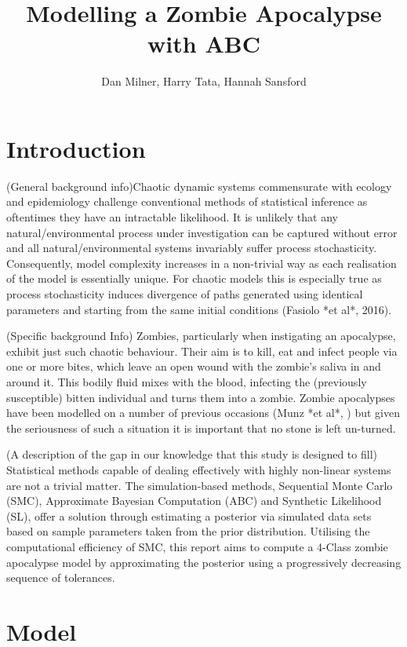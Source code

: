\documentclass[]{article}
\title{Modelling a Zombie Apocalypse with ABC}
\author{Dan Milner, Harry Tata, Hannah Sansford}
\begin{document}

\maketitle

\section{Introduction}

(General background info)Chaotic dynamic systems commensurate with ecology and epidemiology challenge conventional methods of statistical inference as oftentimes they have an intractable likelihood. It is unlikely that any natural/environmental process under investigation can be captured without error and all natural/environmental systems invariably suffer process stochasticity. Consequently, model complexity increases in a non-trivial way as each realisation of the model is essentially unique. For chaotic models this is especially true as process stochasticity induces divergence of paths generated using identical parameters and starting from the same initial conditions (Fasiolo *et al*, 2016).

(Specific background Info) Zombies, particularly when instigating an apocalypse, exhibit just such chaotic behaviour. Their aim is to kill, eat and infect people via one or more bites, which leave an open wound with the zombie's saliva in and around it. This bodily fluid mixes with the blood, infecting the (previously susceptible) bitten individual and turns them into a zombie. Zombie apocalypses have been modelled on a number of previous occasions (Munz *et al*, ) but given the seriousness of such a situation it is important that no stone is left un-turned. 

(A description of the gap in our knowledge that this study is designed to fill) Statistical methods capable of dealing effectively with highly non-linear systems are not a trivial matter. The simulation-based methods, Sequential Monte Carlo (SMC), Approximate Bayesian Computation (ABC) and Synthetic Likelihood (SL), offer a solution through estimating a posterior via simulated data sets based on sample parameters taken from the prior distribution. Utilising the computational efficiency of SMC, this report aims to compute a 4-Class zombie apocalypse model by approximating the posterior using a progressively decreasing sequence of tolerances. 


\section{Model}
\label{model}
\end{document}
